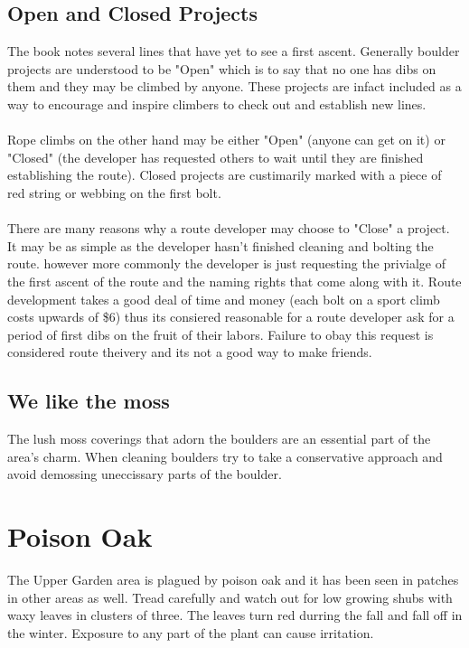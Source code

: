 \subsection*{Open and Closed Projects}
The book notes several lines that have yet to see a first ascent. Generally boulder projects are understood to be "Open" which is to say that no one has dibs on them and they may be climbed by anyone. These projects are infact included as a way to encourage and inspire climbers to check out and establish new lines.\\
\\
Rope climbs on the other hand may be either "Open" (anyone can get on it) or "Closed" (the developer has requested others to wait until they are finished establishing the route). Closed projects are custimarily marked with a piece of red string or webbing on the first bolt.\\
\\
There are many reasons why a route developer may choose to "Close" a project. It may be as simple as the developer hasn't finished cleaning and bolting the route. however more commonly the developer is just requesting the privialge of the first ascent of the route and the naming rights that come along with it. Route development takes a good deal of time and money (each bolt on a sport climb costs upwards of \$6) thus its consiered reasonable for a route developer ask for a period of first dibs on the fruit of their labors. Failure to obay this request is considered route theivery and its not a good way to make friends.\\
\subsection*{We like the moss}
The lush moss coverings that adorn the boulders are an essential part of the area's charm. When cleaning boulders try to take a conservative approach and avoid demossing uneccissary parts of the boulder.
\section{Poison Oak}
The Upper Garden area is plagued by poison oak and it has been seen in patches in other areas as well. Tread carefully and watch out for low growing shubs with waxy leaves in clusters of three. The leaves turn red durring the fall and fall off in the winter. Exposure to any part of the plant can cause irritation.\\

